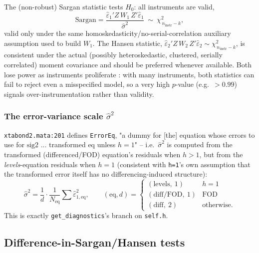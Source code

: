 \documentclass[11pt,a4paper]{article}
\begin{document}
The (non-robust) Sargan statistic tests $H_0$: all instruments are valid,
\[
  \mathrm{Sargan} = \frac{\hat\varepsilon_1'Z\,W_1\,Z'\hat\varepsilon_1}{\hat\sigma^2}
    \ \sim\ \chi^2_{\,n_{\mathrm{instr}}-k},
\]
valid only under the same homoskedasticity/no-serial-correlation auxiliary
assumption used to build $W_1$. The Hansen statistic,
$\hat\varepsilon_2'Z\,W_2\,Z'\hat\varepsilon_2\sim\chi^2_{\,n_{\mathrm{instr}}-k}$,
is consistent under the actual (possibly heteroskedastic, clustered, serially
correlated) moment covariance and should be preferred whenever available.
Both lose power as instruments proliferate \citep{Roodman2009b}: with many
instruments, both statistics can fail to reject even a misspecified model, so
a very high $p$-value (e.g.\ $>0.99$) signals over-instrumentation rather
than validity.

\subsubsection{\texorpdfstring{The error-variance scale $\hat\sigma^2$}{The error-variance scale (sigma-hat squared)}}
\label{sec:sig2}

\texttt{xtabond2.mata:201} defines \texttt{ErrorEq}, "a dummy for [the]
equation whose errors to use for $\mathrm{sig2}$ ... transformed eq unless
$h=1$" -- i.e.\ $\hat\sigma^2$ is computed from the transformed
(differenced/FOD) equation's residuals when $h>1$, but from the
\emph{levels}-equation residuals when $h=1$ (consistent with \texttt{h=1}'s
own assumption that the transformed error itself has no differencing-induced
structure):
\[
  \hat\sigma^2 = \frac{1}{d}\cdot\frac{1}{N_{\text{eq}}}\sum \hat\varepsilon_{1,\text{eq}}^2,
  \qquad
  (\text{eq}, d) = \begin{cases}
    (\text{levels},\ 1) & h=1\\
    (\text{diff/FOD},\ 1) & \text{FOD}\\
    (\text{diff},\ 2) & \text{otherwise.}
  \end{cases}
\]
This is exactly \texttt{get\_diagnostics}'s branch on \texttt{self.h}.

\subsection{Difference-in-Sargan/Hansen tests}
\end{document}
